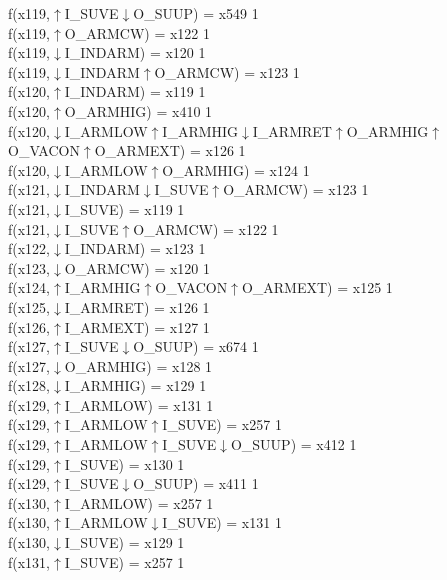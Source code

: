 f(x119,$\uparrow$I\_SUVE$\downarrow$O\_SUUP) = x549 {1} \\
f(x119,$\uparrow$O\_ARMCW) = x122 {1} \\
f(x119,$\downarrow$I\_INDARM) = x120 {1} \\
f(x119,$\downarrow$I\_INDARM$\uparrow$O\_ARMCW) = x123 {1} \\
f(x120,$\uparrow$I\_INDARM) = x119 {1} \\
f(x120,$\uparrow$O\_ARMHIG) = x410 {1} \\
f(x120,$\downarrow$I\_ARMLOW$\uparrow$I\_ARMHIG$\downarrow$I\_ARMRET$\uparrow$O\_ARMHIG$\uparrow$O\_VACON$\uparrow$O\_ARMEXT) = x126 {1} \\
f(x120,$\downarrow$I\_ARMLOW$\uparrow$O\_ARMHIG) = x124 {1} \\
f(x121,$\downarrow$I\_INDARM$\downarrow$I\_SUVE$\uparrow$O\_ARMCW) = x123 {1} \\
f(x121,$\downarrow$I\_SUVE) = x119 {1} \\
f(x121,$\downarrow$I\_SUVE$\uparrow$O\_ARMCW) = x122 {1} \\
f(x122,$\downarrow$I\_INDARM) = x123 {1} \\
f(x123,$\downarrow$O\_ARMCW) = x120 {1} \\
f(x124,$\uparrow$I\_ARMHIG$\uparrow$O\_VACON$\uparrow$O\_ARMEXT) = x125 {1} \\
f(x125,$\downarrow$I\_ARMRET) = x126 {1} \\
f(x126,$\uparrow$I\_ARMEXT) = x127 {1} \\
f(x127,$\uparrow$I\_SUVE$\downarrow$O\_SUUP) = x674 {1} \\
f(x127,$\downarrow$O\_ARMHIG) = x128 {1} \\
f(x128,$\downarrow$I\_ARMHIG) = x129 {1} \\
f(x129,$\uparrow$I\_ARMLOW) = x131 {1} \\
f(x129,$\uparrow$I\_ARMLOW$\uparrow$I\_SUVE) = x257 {1} \\
f(x129,$\uparrow$I\_ARMLOW$\uparrow$I\_SUVE$\downarrow$O\_SUUP) = x412 {1} \\
f(x129,$\uparrow$I\_SUVE) = x130 {1} \\
f(x129,$\uparrow$I\_SUVE$\downarrow$O\_SUUP) = x411 {1} \\
f(x130,$\uparrow$I\_ARMLOW) = x257 {1} \\
f(x130,$\uparrow$I\_ARMLOW$\downarrow$I\_SUVE) = x131 {1} \\
f(x130,$\downarrow$I\_SUVE) = x129 {1} \\
f(x131,$\uparrow$I\_SUVE) = x257 {1} \\

